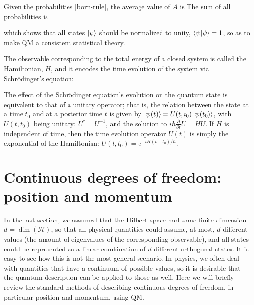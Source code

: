 \documentclass[12pt,a4paper,notitlepage]{report}
\begin{document}
%
Given the probabilities \eqref{born-rule}, the average value of $A$ is
%
%
The sum of all probabilities is

which shows that all states $\ket{\psi}$ should be normalized to unity, $\bra{\psi}\ket{\psi} = 1$, so as to make QM a consistent statistical theory.

The observable corresponding to the total energy of a closed system is called the Hamiltonian, $H$, and it encodes the time evolution of the system via Schrödinger's equation:

%
The effect of the Schrödinger equation's evolution on the quantum state is equivalent to that of a unitary operator; that is, the relation between the state at a time $t_0$ and at a posterior time $t$ is given by $\ket{\psi(t)} = U(t,t_0)\ket{\psi(t_0)}$, with $U(t,t_0)$ being unitary: $U^\dagger = U^{-1}$, and the solution to $i\hbar \tfrac{\partial}{\partial t}U = HU$. If $H$ is independent of time, then the time evolution operator $U(t)$ is simply the exponential of the Hamiltonian: $U(t,t_0) = e^{-iH(t-t_0)/\hbar}$.

\section{Continuous degrees of freedom: position and momentum}
\label{sec:continuous}

In the last section, we assumed that the Hilbert space had some finite dimension $d=\dim\left(\mathcal{H}\right)$, so that all physical quantities could assume, at most, $d$ different values (the amount of eigenvalues of the corresponding observable), and all states could be represented as a linear combination of $d$ different orthogonal states. It is easy to see how this is not the most general scenario. In physics, we often deal with quantities that have a continuum of possible values, so it is desirable that the quantum description can be applied to those as well. Here we will briefly review the standard methods of describing continuous degrees of freedom, in particular position and momentum, using QM.
\end{document}
